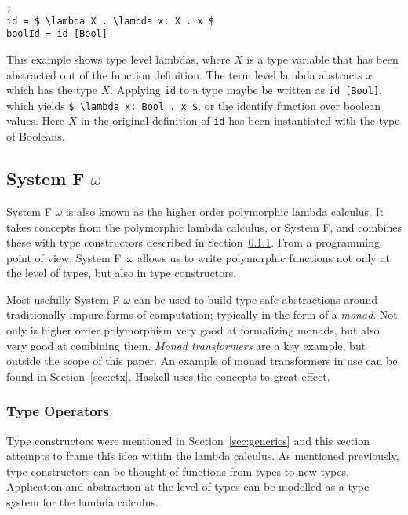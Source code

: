\begin{lstlisting}[mathescape, nolol, label={lst:systemf}];
id = $ \lambda X . \lambda x: X . x $
boolId = id [Bool]
\end{lstlisting}

This example shows type level lambdas, where $ X $
is a type variable that has been abstracted out of the function definition. The
term level lambda abstracts $ x $ which has the type $ X $. Applying \lstinline{id}
to a type maybe be written as \lstinline[mathescape]{id [Bool]}, which 
yields \lstinline[mathescape]{$ \lambda x: Bool . x $}, or the identify function
over boolean values. Here $ X $ in the original definition of \lstinline{id} has
been instantiated with the type of Booleans.

\subsection{System F $\omega$}\label{sec:omega}
System F $\omega$ is also known as the higher order polymorphic lambda calculus. It
takes concepts from the polymorphic lambda calculus, or System F, and combines
these with type constructors described in Section~\ref{sec:tyops}. From a
programming point of view, System F~$\omega$ allows us to write polymorphic
functions not only at the level of types, but also in type constructors.

Most usefully System F $\omega$ can be used to build type safe abstractions
around traditionally impure forms of computation; typically in the form of
a \textit{monad}. Not only is higher order polymorphism very good at formalizing
monads, but also very good at combining them. \textit{Monad transformers} are
a key example, but outside the scope of this paper. An example of monad transformers
in use can be found in Section~\ref{sec:ctx}. Haskell uses the concepts to
great effect.

\subsubsection{Type Operators}\label{sec:tyops}
Type constructors were mentioned in Section~\ref{sec:generics} and this
section attempts to frame this idea within the lambda calculus. As mentioned
previously, type constructors can be thought of functions from types to new
types. Application and abstraction at the level of types can be modelled as a
type system for the lambda calculus.            

